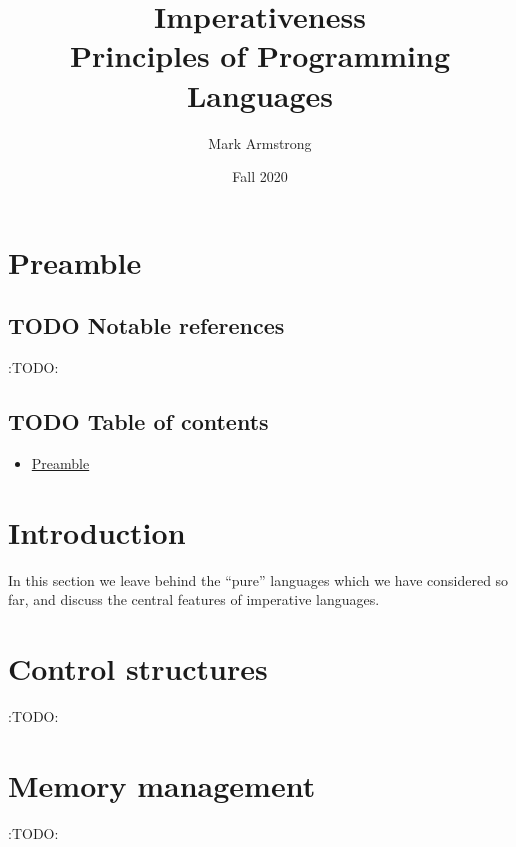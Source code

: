 \documentclass[11pt]{article}
\author{Mark Armstrong}
\date{Fall 2020}
\title{Imperativeness\\\medskip
\large Principles of Programming Languages}
\theoremstyle{definition}
\begin{document}
\maketitle

\section{Preamble}
\label{sec:orga0be171}

\subsection{{\bfseries\sffamily TODO} Notable references}
\label{sec:orgc8ba0da}

:TODO:

\subsection{{\bfseries\sffamily TODO} Table of contents}
\label{sec:org7cd4dc6}

\begin{scriptsize}
\begin{itemize}
\item \hyperref[sec:orga0be171]{Preamble}
\end{itemize}
\end{scriptsize}

\section{Introduction}
\label{sec:org0a94bfd}

In this section we leave behind the “pure” languages
which we have considered so far, and discuss the central features
of imperative languages.
\section{Control structures}
\label{sec:org7e7fe15}

:TODO:

\section{Memory management}
\label{sec:orgdf0595b}

:TODO:
\end{document}
